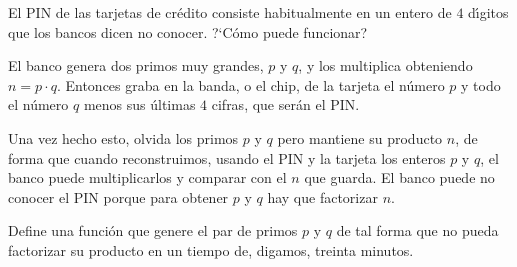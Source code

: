 \begin{ejer}

El PIN de las tarjetas de cr\'edito consiste habitualmente en un entero de $4$ 
d\'{\i}gitos que los bancos dicen no conocer. ?`C\'omo puede funcionar?

El banco genera dos primos muy grandes, $p$ y $q$, y los multiplica obteniendo 
$n=p\cdot q$.  Entonces graba en la banda, o el chip, de la tarjeta 
el n\'umero $p$ y todo el n\'umero $q$ menos sus \'ultimas $4$ cifras, que 
ser\'an el PIN. 

Una vez hecho esto, olvida los primos $p$ y $q$ pero mantiene su producto $n$, 
de forma que cuando reconstruimos, usando el PIN y la tarjeta los enteros $p$ y 
$q$, el banco puede multiplicarlos y comparar con el $n$ que guarda. El banco 
puede no conocer el PIN  porque para obtener $p$ y $q$ hay que factorizar $n$. 


Define una funci\'on que genere el par de primos $p$ y $q$ de tal forma que 
{\sage} no pueda factorizar su producto en un tiempo  de, digamos, treinta 
minutos. 
\end{ejer}
